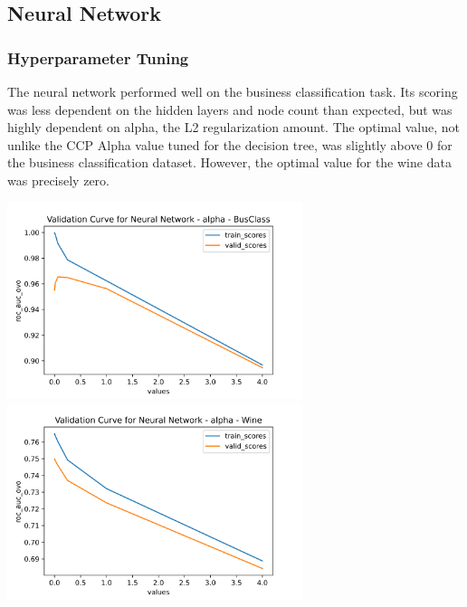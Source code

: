 \documentclass[
	letterpaper, %
]{jdf}
\begin{document}
\subsection{Neural Network}

\subsubsection{Hyperparameter Tuning}

The neural network performed well on the business classification task. Its scoring was less dependent on the hidden layers and node count than expected, but was highly dependent on alpha, the L2 regularization amount. The optimal value, not unlike the CCP Alpha value tuned for the decision tree, was slightly above 0 for the business classification dataset. However, the optimal value for the wine data was precisely zero.

\includegraphics[width=3.4in]{Figures/BusClass-0920/NN/val_curve_0.png}
\includegraphics[width=3.4in]{Figures/Wine-0921/NN/val_curve_0.png}
\end{document}
